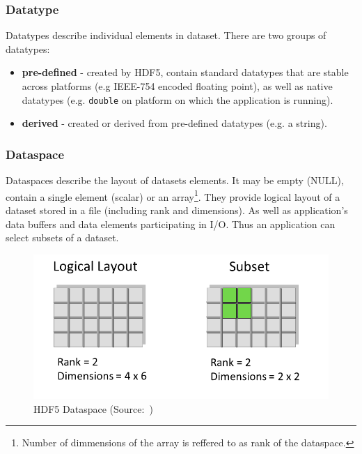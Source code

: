 \documentclass[thesis=M,english]{FITthesis}[2019/12/23]
\begin{document}
\subsubsection{Datatype}

Datatypes describe individual elements in dataset. There are two groups of datatypes:
\begin{itemize}
    \item \textbf{pre-defined} - created by HDF5, contain standard datatypes that are stable across platforms
          (e.g IEEE-754 encoded floating point), as well as native datatypes (e.g. \texttt{double} on platform
          on which the application is running).
    \item \textbf{derived} - created or derived from pre-defined datatypes (e.g. a string).
\end{itemize}

\subsubsection{Dataspace}

Dataspaces describe the layout of datasets elements. It may be empty (NULL), contain a single element (scalar)
or an array\footnote{Number of dimmensions of the array is reffered to as rank of the dataspace.}. They provide
logical layout of a dataset stored in a file (including rank and dimensions). As well as application's data buffers
and data elements participating in I/O. Thus an application can select subsets of a dataset.

\begin{figure}[H]
    \centering
    \includegraphics[scale=0.3]{static/dataspace.png}
    \caption{HDF5 Dataspace (Source:~\cite{hdf5})}
\end{figure}
\end{document}
